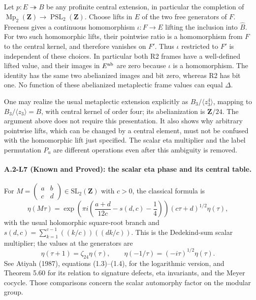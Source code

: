 Let $p:E\twoheadrightarrow\widehat B$ be any profinite central
extension, in particular the completion of
$\operatorname{Mp}_2(\mathbf Z)\to\operatorname{PSL}_2(\mathbf Z)$.
Choose lifts in $E$ of the two free generators of $F$. Freeness
gives a continuous homomorphism $\iota:F\to E$ lifting the
inclusion into $\widehat B$. For two such homomorphic lifts,
their pointwise ratio is a homomorphism from $F$ to the central
kernel, and therefore vanishes on $F'$. Thus $\iota$ restricted
to $F'$ is independent of these choices. In particular both
R2 frames have a well-defined lifted value, and their images
in $E^{\rm ab}$ are zero because $\iota$ is a homomorphism.
The identity has the same two abelianized images and bit zero,
whereas R2 has bit one. No function of these abelianized
metaplectic frame values can equal $\Delta$.

One may realize the usual metaplectic extension explicitly as
$B_3/\langle z_3^4\rangle$, mapping to
$B_3/\langle z_3\rangle=B$, with central kernel of order four;
its abelianization is $\mathbf Z/24$. The argument above does
not require this presentation. It also shows why arbitrary
pointwise lifts, which can be changed by a central element,
must not be confused with the homomorphic lift just specified.
The scalar eta multiplier and the label permutation $P_u$
are different operations even after this ambiguity is removed.

\paragraph{A.2-L7 (Known and Proved): the scalar eta phase and its central table.}
For $M=\left(\begin{smallmatrix}a&b\\c&d\end{smallmatrix}\right)
\in\mathrm{SL}_2(\mathbf Z)$ with $c>0$, the classical formula is
\[
 \eta(M\tau)=
 \exp\!\left(\pi i\left(\frac{a+d}{12c}-s(d,c)-\frac14\right)\right)
 (c\tau+d)^{1/2}\eta(\tau),
\]
with the usual holomorphic square-root branch and
$s(d,c)=\sum_{k=1}^{c-1}((k/c))((dk/c))$.
This is the Dedekind-sum scalar multiplier; the values at the
generators are
\[
 \eta(\tau+1)=\zeta_{24}\eta(\tau),\qquad
 \eta(-1/\tau)=(-i\tau)^{1/2}\eta(\tau).
\]
See Atiyah (1987), equations (1.3)--(1.4), for the logarithmic
version, and Theorem 5.60 for its relation to signature defects,
eta invariants, and the Meyer cocycle. Those comparisons concern
the scalar automorphy factor on the modular group.

